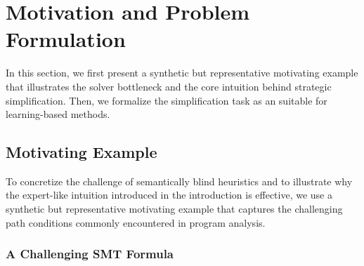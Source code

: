 \section{Motivation and Problem Formulation}
\label{sec:motivation-and-problem}


In this section, we first present a synthetic but representative motivating example that illustrates the solver bottleneck and the core intuition behind strategic simplification. Then, we formalize the simplification task as an \MDP{} suitable for learning-based methods.


\subsection{Motivating Example}
\label{sec:motivating-example}

To concretize the challenge of semantically blind heuristics and to illustrate why the expert-like intuition introduced in the introduction is effective, we use a synthetic but representative motivating example that captures the challenging path conditions commonly encountered in program analysis.

\subsubsection{A Challenging SMT Formula}

